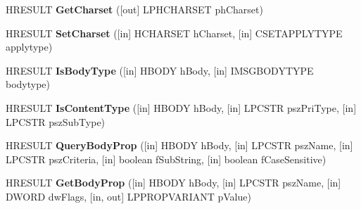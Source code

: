 \begin{DoxyCompactItemize}
\item 
\mbox{\label{interface_m_i_m_e_o_l_e_1_1_i_mime_message_tree_a582f12706be89eb9feb3695829d5226f}} 
H\+R\+E\+S\+U\+LT {\bfseries Get\+Charset} (\mbox{[}out\mbox{]} L\+P\+H\+C\+H\+A\+R\+S\+ET ph\+Charset)
\item 
\mbox{\label{interface_m_i_m_e_o_l_e_1_1_i_mime_message_tree_a22cf2838368f6fa7cf43875e81a9c141}} 
H\+R\+E\+S\+U\+LT {\bfseries Set\+Charset} (\mbox{[}in\mbox{]} H\+C\+H\+A\+R\+S\+ET h\+Charset, \mbox{[}in\mbox{]} C\+S\+E\+T\+A\+P\+P\+L\+Y\+T\+Y\+PE applytype)
\item 
\mbox{\label{interface_m_i_m_e_o_l_e_1_1_i_mime_message_tree_aad95374870506a579f6a4537ef8cf688}} 
H\+R\+E\+S\+U\+LT {\bfseries Is\+Body\+Type} (\mbox{[}in\mbox{]} H\+B\+O\+DY h\+Body, \mbox{[}in\mbox{]} I\+M\+S\+G\+B\+O\+D\+Y\+T\+Y\+PE bodytype)
\item 
\mbox{\label{interface_m_i_m_e_o_l_e_1_1_i_mime_message_tree_a393dbca2b83e46427086578ca3a19e7a}} 
H\+R\+E\+S\+U\+LT {\bfseries Is\+Content\+Type} (\mbox{[}in\mbox{]} H\+B\+O\+DY h\+Body, \mbox{[}in\mbox{]} L\+P\+C\+S\+TR psz\+Pri\+Type, \mbox{[}in\mbox{]} L\+P\+C\+S\+TR psz\+Sub\+Type)
\item 
\mbox{\label{interface_m_i_m_e_o_l_e_1_1_i_mime_message_tree_aeebaeccdbec51346594f2c2a7aabe762}} 
H\+R\+E\+S\+U\+LT {\bfseries Query\+Body\+Prop} (\mbox{[}in\mbox{]} H\+B\+O\+DY h\+Body, \mbox{[}in\mbox{]} L\+P\+C\+S\+TR psz\+Name, \mbox{[}in\mbox{]} L\+P\+C\+S\+TR psz\+Criteria, \mbox{[}in\mbox{]} boolean f\+Sub\+String, \mbox{[}in\mbox{]} boolean f\+Case\+Sensitive)
\item 
\mbox{\label{interface_m_i_m_e_o_l_e_1_1_i_mime_message_tree_a9129039a31a76d1add423a40f0ffdbee}} 
H\+R\+E\+S\+U\+LT {\bfseries Get\+Body\+Prop} (\mbox{[}in\mbox{]} H\+B\+O\+DY h\+Body, \mbox{[}in\mbox{]} L\+P\+C\+S\+TR psz\+Name, \mbox{[}in\mbox{]} D\+W\+O\+RD dw\+Flags, \mbox{[}in, out\mbox{]} L\+P\+P\+R\+O\+P\+V\+A\+R\+I\+A\+NT p\+Value)
\item 

\end{DoxyCompactItemize}
